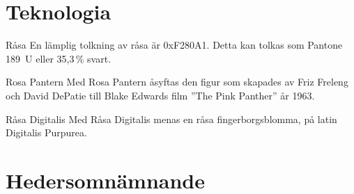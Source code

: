 \documentclass[pdfbookmarks,a4paper,11pt]{article}
\newlength{\itemcollength}
\newenvironment{reglemlista}{%
  \begin{list}{}{%
      \setlength{\labelwidth}{\itemcollength}%
      \setlength{\leftmargin}{\labelwidth + \labelsep}%
      \renewcommand{\makelabel}[1]{%
        \raisebox{0pt}[1ex][0pt]{%
          \makebox[\labelwidth][l]{%
            \parbox[t]{\itemcollength}{%
              \raggedright\hspace{0pt}##1}}}\hfill}%
      }}{%
  \end{list}}
\begin{document}
\section{Teknologia}

\begin{reglemlista}

  \item[Råsa]
    En lämplig tolkning av råsa är 0xF280A1. Detta kan tolkas som Pantone
    189~U eller 35,3\,\% svart.

  \item[Rosa Pantern]
    Med Rosa Pantern åsyftas den figur som skapades av Friz Freleng och David
    DePatie till Blake Edwards film ''The Pink Panther'' år 1963.

  \item[Råsa Digitalis]
    Med Råsa Digitalis menas en råsa fingerborgsblomma, på latin Digitalis Purpurea.

\end{reglemlista}





\section{Hedersomnämnande}
\end{document}
